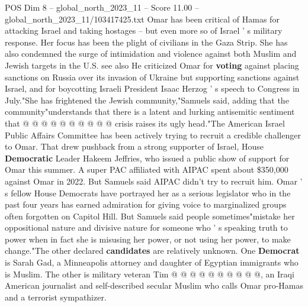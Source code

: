\begin{textsample}{POS Dim 8 – global\_north\_2023\_11 – Score 11.00 – global\_north\_2023\_11/103417425.txt}
Omar has been critical of Hamas for attacking Israel and taking hostages -- but even more so of Israel ' s military response.
Her focus has been the plight of civilians in the Gaza Strip.
She has also condemned the surge of intimidation and violence against both Muslim and Jewish targets in the U.S. see also He criticized Omar for \textbf{voting} against placing sanctions on Russia over its invasion of Ukraine but supporting sanctions against Israel, and for boycotting Israeli President Isaac Herzog ' s speech to Congress in July."She has frightened the Jewish community,"Samuels said, adding that the community"understands that there is a latent and lurking antisemitic sentiment that @ @ @ @ @ @ @ @ @ @ crisis raises its ugly head."The American Israel Public Affairs Committee has been actively trying to recruit a credible challenger to Omar.
That drew pushback from a strong supporter of Israel, House \textbf{Democratic} Leader Hakeem Jeffries, who issued a public show of support for Omar this summer.
A super PAC affiliated with AIPAC spent about \$350,000 against Omar in 2022.
But Samuels said AIPAC didn't try to recruit him.
Omar ' s fellow House Democrats have portrayed her as a serious legislator who in the past four years has earned admiration for giving voice to marginalized groups often forgotten on Capitol Hill.
But Samuels said people sometimes"mistake her oppositional nature and divisive nature for someone who ' s speaking truth to power when in fact she is misusing her power, or not using her power, to make change."The other declared \textbf{candidates} are relatively unknown.
One \textbf{Democrat} is Sarah Gad, a Minneapolis attorney and daughter of Egyptian immigrants who is Muslim.
The other is military veteran Tim @ @ @ @ @ @ @ @ @ @, an Iraqi American journalist and self-described secular Muslim who calls Omar pro-Hamas and a terrorist sympathizer.

\end{textsample}
